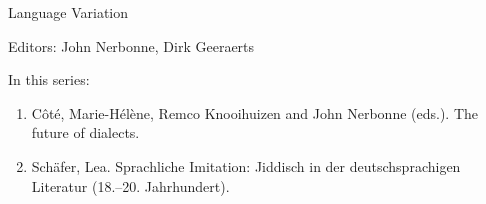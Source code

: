 {\large Language Variation}

\bigskip

Editors: John Nerbonne, Dirk Geeraerts

\bigskip

In this series:

\begin{enumerate}
\item Côté, Marie-Hélène, Remco Knooihuizen and John Nerbonne (eds.). The future of dialects.
\item Schäfer, Lea. Sprachliche Imitation: Jiddisch in der deutschsprachigen
Literatur (18.–20. Jahrhundert).
\end{enumerate}



\vfill



